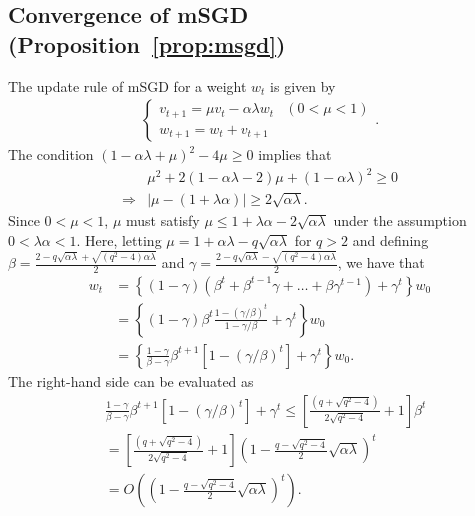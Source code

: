 \documentclass[conference]{IEEEtran}
\begin{document}
\subsection{Convergence of mSGD (Proposition~\ref{prop:msgd})}
The update rule of mSGD for a weight $w_t$ is given by
\begin{align*}
	\left \{
		\begin{array}{ll}
		v_{t+1} = \mu v_{t} - \alpha \lambda w_t	&	\left( 0 < \mu < 1 \right ) \\
		w_{t+1} = w_t + v_{t+1}
		\end{array}.
	\right.
\end{align*}
The condition $(1-\alpha \lambda + \mu)^2 - 4\mu \geq 0$ implies that
\begin{align*}
& \mu^2 + 2(1-\alpha \lambda -2 ) \mu + (1 - \alpha \lambda)^2  \geq 0 \\
\Rightarrow &
  |\mu -( 1+\lambda \alpha)| \geq 2 \sqrt{\alpha \lambda}.
\end{align*}
Since $0 < \mu < 1$, $\mu$ must satisfy $\mu \leq 1 + \lambda \alpha - 2 \sqrt{\alpha \lambda}$
under the assumption $0 < \lambda \alpha < 1$.
Here, letting $\mu = 1 + \alpha \lambda - q \sqrt{\alpha \lambda}$ for $q > 2$
and defining 
$\beta = \frac{2 - q\sqrt{\alpha \lambda} + \sqrt{(q^2 - 4)\alpha \lambda}}{2}$ and 
$\gamma = \frac{2 - q\sqrt{\alpha \lambda} - \sqrt{(q^2 - 4)\alpha \lambda}}{2}$,
we have that 
\begin{align*}
w_t & = \left\{ (1 - \gamma) (\beta^t + \beta^{t-1} \gamma + \dots + \beta \gamma^{t-1}) + \gamma^t \right\} w_0  \\
&  =\left\{  (1 - \gamma) \beta^{t} \frac{1 -( \gamma/\beta)^t}{1 - \gamma/\beta} + \gamma^t \right\} w_0  \\
&  = \left\{ \frac{1 - \gamma}{\beta - \gamma} \beta^{t+1} [1 -( \gamma/\beta)^t] + \gamma^t \right\} w_0.
\end{align*}
The right-hand side can be evaluated as 
\begin{align*}
& \frac{1 - \gamma}{\beta - \gamma} \beta^{t+1} [1 -( \gamma/\beta)^t] + \gamma^t  
	\leq  \left[ \frac{(q + \sqrt{q^2 -4}) }{2 \sqrt{q^2 -4}} + 1 \right]\beta^t \\
&   = \left[ \frac{(q + \sqrt{q^2 -4}) }{2 \sqrt{q^2 -4}} + 1 \right]
    	\left(1 - \frac{q - \sqrt{q^2 - 4}}{2} \sqrt{\alpha \lambda}  \right)^t \\
&   = O\left( \left(1 - \frac{q - \sqrt{q^2 - 4}}{2} \sqrt{\alpha \lambda}  \right)^t \right). \\
\end{align*}
\end{document}
